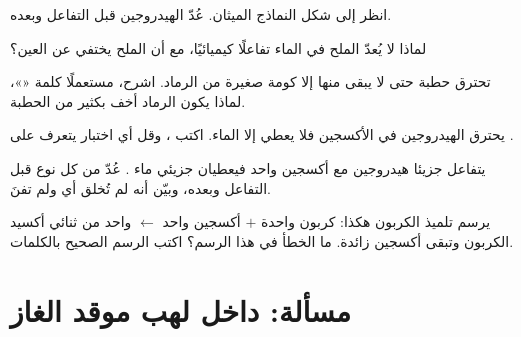 \begin{exercise}[$\star\star$]\label{exo:g7:chemical-reactions:7}
انظر إلى شكل النماذج  الميثان. عُدّ  الهيدروجين قبل التفاعل
وبعده.
\end{exercise}

\begin{exercise}[$\star\star$]\label{exo:g7:chemical-reactions:8}
لماذا لا يُعدّ  الملح في الماء تفاعلًا كيميائيًا، مع أن الملح يختفي
عن العين؟
\end{exercise}

\begin{exercise}[$\star\star$]\label{exo:g7:chemical-reactions:9}
تحترق حطبة حتى لا يبقى منها إلا كومة صغيرة من الرماد. اشرح، مستعملًا كلمة
«»، لماذا يكون الرماد أخف بكثير من الحطبة.
\end{exercise}

\begin{exercise}[$\star\star$]\label{exo:g7:chemical-reactions:10}
يحترق الهيدروجين في الأكسجين فلا يعطي إلا الماء. اكتب ،
وقل أي اختبار يتعرف على .
\end{exercise}

\begin{exercise}[$\star\star\star$]\label{exo:g7:chemical-reactions:11}
يتفاعل جزيئا هيدروجين  مع  أكسجين واحد 
فيعطيان جزيئي ماء . عُدّ  من كل نوع قبل التفاعل وبعده،
وبيّن أنه لم تُخلق أي  ولم تفنَ.
\end{exercise}

\begin{exercise}[$\star\star\star$]\label{exo:g7:chemical-reactions:12}
يرسم تلميذ  الكربون هكذا:  كربون واحدة $+$  أكسجين
واحد $\longleftarrow$  واحد من ثنائي أكسيد الكربون وتبقى 
أكسجين زائدة. ما الخطأ في هذا الرسم؟ اكتب الرسم الصحيح
بالكلمات.
\end{exercise}

\section{مسألة: داخل لهب موقد الغاز}

